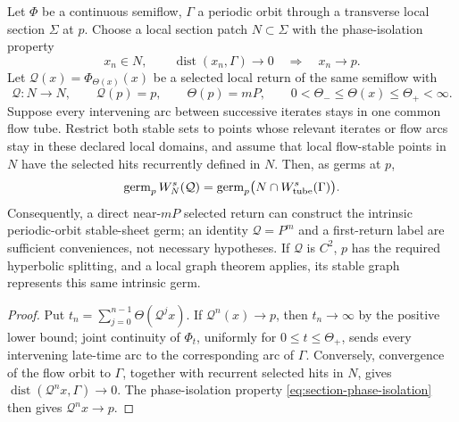 \begin{lemma}
\label{lem:direct-selected-stable-germ}
Let \(\Phi\) be a continuous semiflow, \(\Gamma\) a periodic orbit through a
transverse local section \(\Sigma\) at \(p\).  Choose a local section patch
\(N\subset\Sigma\) with the phase-isolation property
\begin{equation}
 x_n\in N,\qquad \operatorname{dist}(x_n,\Gamma)\to0
 \quad\Longrightarrow\quad x_n\to p.                 \label{eq:section-phase-isolation}
\end{equation}
Let \(\mathcal Q(x)=\Phi_{\Theta(x)}(x)\) be a selected local return of the
same semiflow with
\[
 \mathcal Q\colon N\to N,\qquad \mathcal Q(p)=p,\qquad
 \Theta(p)=mP,\qquad
 0<\Theta_-\le\Theta(x)\le\Theta_+<\infty.
\]
Suppose every intervening arc between successive iterates stays in one common
flow tube.  Restrict both stable sets to points whose relevant iterates or
flow arcs stay in these declared local domains, and assume that local
flow-stable points in \(N\) have the selected hits recurrently defined in
\(N\).  Then, as germs at \(p\),
\begin{equation}
 \operatorname{germ}_p W^s_N(\mathcal Q)
 =\operatorname{germ}_p\bigl(N\cap W^s_{\rm tube}(\Gamma)\bigr).
                                                               \label{eq:direct-return-stable-germ}
\end{equation}
Consequently, a direct near-\(mP\) selected return can construct the intrinsic
periodic-orbit stable-sheet germ; an identity \(\mathcal Q=P^m\) and a
first-return label are sufficient conveniences, not necessary hypotheses.
If \(\mathcal Q\) is \(C^2\), \(p\) has the required hyperbolic splitting,
and a local graph theorem applies, its stable graph represents this same
intrinsic germ.
\end{lemma}

\begin{proof}
Put
\(t_n=\sum_{j=0}^{n-1}\Theta(\mathcal Q^j x)\).  If
\(\mathcal Q^n(x)\to p\), then \(t_n\to\infty\) by the positive lower bound;
joint continuity of \(\Phi_t\), uniformly for
\(0\le t\le\Theta_+\), sends every intervening late-time arc to the
corresponding arc of \(\Gamma\).  Conversely, convergence of the flow orbit
to \(\Gamma\), together with recurrent selected hits in \(N\), gives
\(\operatorname{dist}(\mathcal Q^n x,\Gamma)\to0\).  The phase-isolation
property \cref{eq:section-phase-isolation} then gives
\(\mathcal Q^n x\to p\).
\end{proof}

